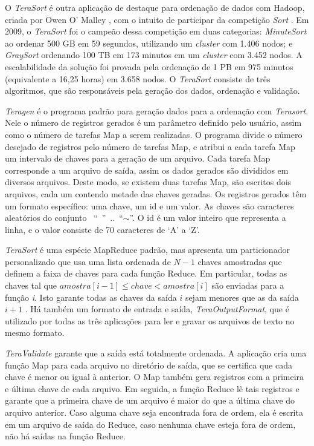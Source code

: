 O \textit{TeraSort} é outra aplicação de destaque para ordenação de dados com Hadoop, criada por Owen O' Malley \cite{OMalley:2009}, com o intuito de participar da competição \textit{Sort} \cite{Gray:1998}. Em 2009, o \textit{TeraSort} foi o campeão dessa competição em duas categorias: \textit{MinuteSort} ao ordenar 500 GB em 59 segundos, utilizando um \textit{cluster} com 1.406 nodos; e \textit{GraySort} ordenando 100 TB em 173 minutos em um \textit{cluster} com 3.452 nodos. A escalabilidade da solução foi provada pela ordenação de 1 PB em 975 minutos (equivalente a 16,25 horas) em 3.658 nodos.
O \textit{TeraSort} consiste de três algoritmos, que são responsáveis pela geração dos dados, ordenação e validação. 

\textit{Teragen} é o programa padrão para geração dados para a ordenação com \textit{Terasort}.
Nele o número de registros gerados é um parâmetro definido pelo usuário, assim como o número de tarefas Map a serem realizadas. O programa divide o número desejado de registros pelo número de tarefas Map, e atribui a cada tarefa Map um intervalo de chaves para a geração de um arquivo. Cada tarefa Map corresponde a um arquivo de saída, assim os dados gerados são divididos em diversos arquivos. Deste modo, se existem duas tarefas Map, são escritos dois arquivos, cada um contendo metade das chaves geradas. 
Os registros gerados têm um formato específico: uma chave, um id e um valor. As  chaves são caracteres aleatórios do conjunto \mbox{ `` '' .. ``$\sim$''}. O id é um valor inteiro que representa a linha, e o valor consiste de 70 caracteres de `A' a `Z'. 

\textit{TeraSort} é uma espécie MapReduce padrão, mas apresenta um particionador personalizado que usa uma lista ordenada de $ N-1 $ chaves amostradas que definem a faixa de chaves para cada função Reduce. 
Em particular, todas as chaves tal que $amostra [i-1] \le chave < amostra[i] $ são enviadas para a função \textit{i}. 
Isto garante todas as chaves da saída $i$ sejam menores que as da saída $i + 1$ .
Há também um formato de entrada e saída, \textit{TeraOutputFormat}, que é utilizado	 por todas as três aplicações  para ler e gravar os arquivos de texto no mesmo formato. 

\textit{TeraValidate} garante que a saída está totalmente ordenada. A aplicação cria uma função Map para cada arquivo no diretório de saída, que se certifica que cada chave é  menor ou igual à anterior. O Map também gera registros com a primeira e última chave de cada arquivo. Em seguida, a função Reduce lê tais registros e garante que a primeira chave de um arquivo é maior do que a última chave do arquivo anterior. Caso alguma chave seja encontrada fora de ordem, ela é escrita em um  arquivo de saída do Reduce, caso nenhuma chave esteja fora de ordem, não há saídas na função Reduce.

